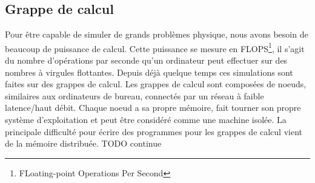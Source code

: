 \subsection{Grappe de calcul}
Pour être capable de simuler de grands problèmes physique, nous avons besoin de beaucoup de puissance de calcul.
%
Cette puissance se mesure en FLOPS\footnote{FLoating-point Operations Per Second}, il s'agit du nombre d'opérations par seconde qu'un ordinateur peut effectuer sur des nombres à virgules flottantes.
%
Depuis déjà quelque temps ces simulations sont faites sur des grappes de calcul.
%
Les grappes de calcul sont composées de noeuds, similaires aux ordinateurs de bureau, connectés par un réseau à faible latence/haut débit.
%
Chaque noeud a sa propre mémoire, fait tourner son propre système d'exploitation et peut être considéré comme une machine isolée.
%
La principale difficulté pour écrire des programmes pour les grappes de calcul vient de la mémoire distribuée. TODO continue
